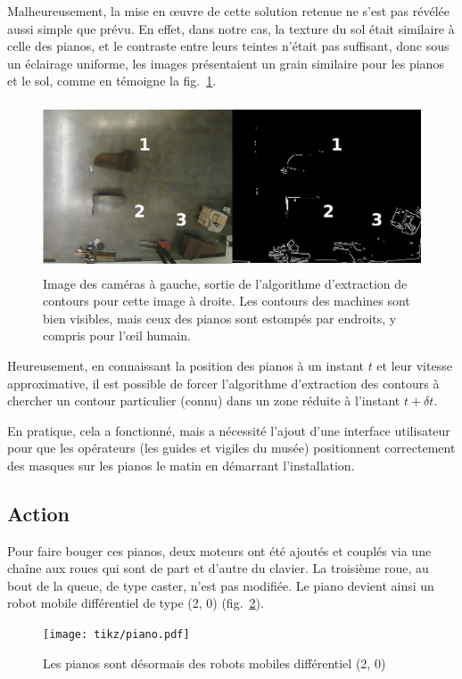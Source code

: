 \documentclass[french,A4paper,]{book}
\begin{document}
Malheureusement, la mise en œuvre de cette solution retenue ne s'est pas
révélée aussi simple que prévu. En effet, dans notre cas, la texture du
sol était similaire à celle des pianos, et le contraste entre leurs
teintes n'était pas suffisant, donc sous un éclairage uniforme, les
images présentaient un grain similaire pour les pianos et le sol, comme
en témoigne la fig.~\ref{fig:extraction}.

\begin{figure}
\centering
\includegraphics[height=5.00000cm]{imgs/pbvision.jpg}
\caption{Image des caméras à gauche, sortie de l'algorithme d'extraction
de contours pour cette image à droite. Les contours des machines sont
bien visibles, mais ceux des pianos sont estompés par endroits, y
compris pour l'œil humain.}\label{fig:extraction}
\end{figure}

Heureusement, en connaissant la position des pianos à un instant \(t\)
et leur vitesse approximative, il est possible de forcer l'algorithme
d'extraction des contours à chercher un contour particulier (connu) dans
un zone réduite à l'instant \(t + \delta t\).

En pratique, cela a fonctionné, mais a nécessité l'ajout d'une interface
utilisateur pour que les opérateurs (les guides et vigiles du musée)
positionnent correctement des masques sur les pianos le matin en
démarrant l'installation.

\subsection{Action}\label{sec:action}

Pour faire bouger ces pianos, deux moteurs ont été ajoutés et couplés
via une chaîne aux roues qui sont de part et d'autre du clavier. La
troisième roue, au bout de la queue, de type caster, n'est pas modifiée.
Le piano devient ainsi un robot mobile différentiel de type (2, 0)
(fig.~\ref{fig:piano}).

\begin{figure}
\centering
\texttt{[image: tikz/piano.pdf]}
\caption{Les pianos sont désormais des robots mobiles différentiel (2,
0)}\label{fig:piano}
\end{figure}
\end{document}
